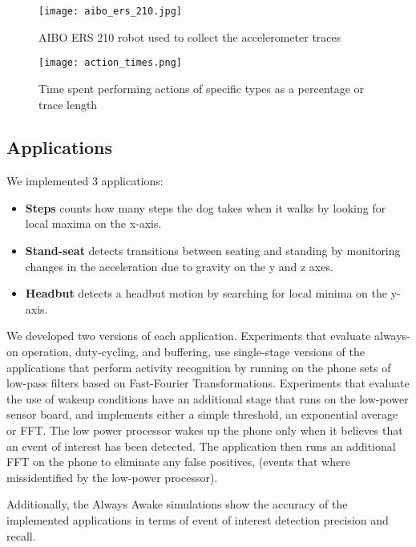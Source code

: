 \begin{figure}[t]
	\texttt{[image: aibo\_ers\_210.jpg]}
	\caption{AIBO ERS 210 robot used to collect the accelerometer traces}
	\label{fig:aibo}
\end{figure}


\begin{figure}[t]
	\texttt{[image: action\_times.png]}
	\caption{Time spent performing actions of specific types as a percentage or trace length}
	\label{fig:actionTimes}
\end{figure}


\subsection{Applications}

We implemented 3 applications:

\begin{itemize}

\item {\bf Steps} counts how many steps the dog takes when it walks by
  looking for local maxima on the x-axis.


\item {\bf Stand-seat} detects transitions between seating and
  standing  by monitoring changes in the acceleration due to gravity
  on the y and z axes.



\item {\bf Headbut} detects a headbut motion by searching for local
  minima on the y-axis.

\end{itemize}

We developed two versions of each application.  Experiments that
evaluate always-on operation, duty-cycling, and buffering, use
single-stage versions of the applications that perform activity
recognition by running on the phone sets of low-pass filters based on
Fast-Fourier Transformations.  Experiments that evaluate the use of
wakeup conditions have an additional stage that runs on the low-power
sensor board, and implements either a simple threshold, an exponential
average or FFT.  The low power processor wakes up the phone only when
it believes that an event of interest has been detected.  The
application then runs an additional FFT on the phone to eliminate any
false positives, (events that where missidentified by the low-power
processor).


Additionally, the Always Awake simulations show
the accuracy of the implemented applications in terms of event of
interest detection precision and recall. 


